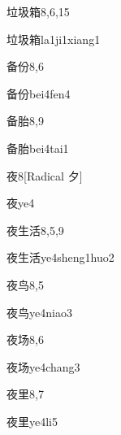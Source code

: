 \begin{entry}{垃圾箱}{8,6,15}
  \begin{phonetics}{垃圾箱}{la1ji1xiang1}
  \end{phonetics}
\end{entry}

\begin{entry}{备份}{8,6}
  \begin{phonetics}{备份}{bei4fen4}
  \end{phonetics}
\end{entry}

\begin{entry}{备胎}{8,9}
  \begin{phonetics}{备胎}{bei4tai1}
  \end{phonetics}
\end{entry}

\begin{entry}{夜}{8}[Radical 夕]
  \begin{phonetics}{夜}{ye4}
  \end{phonetics}
\end{entry}

\begin{entry}{夜生活}{8,5,9}
  \begin{phonetics}{夜生活}{ye4sheng1huo2}
  \end{phonetics}
\end{entry}

\begin{entry}{夜鸟}{8,5}
  \begin{phonetics}{夜鸟}{ye4niao3}
  \end{phonetics}
\end{entry}

\begin{entry}{夜场}{8,6}
  \begin{phonetics}{夜场}{ye4chang3}
  \end{phonetics}
\end{entry}

\begin{entry}{夜里}{8,7}
  \begin{phonetics}{夜里}{ye4li5}
  \end{phonetics}
\end{entry}

